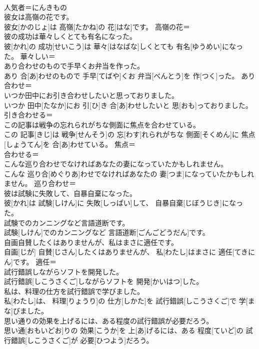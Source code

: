 \documentclass[8pt]{extreport}
\begin{document}
\begin{CJK}{UTF8}{min}
\\	人気者＝にんきもの
\\	彼女は高嶺の花です。	
\\	彼女[かのじょ]は 高嶺[たかね]の 花[はな]です。	高嶺の花＝ 
\\	彼の成功は華々しくとても有名になった。	
\\	彼[かれ]の 成功[せいこう]は 華々[はなばな]しくとても 有名[ゆうめい]になった。	華々しい＝ 
\\	あり合わせのもので手早くお弁当を作った。	
\\	あり 合[あ]わせのもので 手早[てばや]くお 弁当[べんとう]を 作[つく]った。	あり合わせ＝ 
\\	いつか田中にお引き合わせしたいと思っておりました。	
\\	いつか 田中[たなか]にお 引[ひ]き 合[あ]わせしたいと 思[おも]っておりました。	引き合わせる＝ 
\\	この記事は戦争の忘れられがちな側面に焦点を合わせている。	
\\	この 記事[きじ]は 戦争[せんそう]の 忘[わす]れられがちな 側面[そくめん]に 焦点[しょうてん]を 合[あ]わせている。	焦点＝ 
\\	合わせる＝ 
\\	こんな巡り合わせでなければあなたの妻になっていたかもしれません。	
\\	こんな 巡り合[めぐりあ]わせでなければあなたの 妻[つま]になっていたかもしれません。	巡り合わせ＝ 
\\	彼は試験に失敗して、自暴自棄になった。	
\\	彼[かれ]は 試験[しけん]に 失敗[しっぱい]して、 自暴自棄[じぼうじき]になった。	
\\	試験でのカンニングなど言語道断です。	
\\	試験[しけん]でのカンニングなど 言語道断[ごんごどうだん]です。	
\\	自画自賛したくはありませんが、私はまさに適任です。	
\\	自画[じが] 自賛[じさん]したくはありませんが、 私[わたし]はまさに 適任[てきにん]です。	適任＝ 
\\	試行錯誤しながらソフトを開発した。	
\\	試行錯誤[しこうさくご]しながらソフトを 開発[かいはつ]した。	
\\	私は、料理の仕方を試行錯誤で学びました。	
\\	私[わたし]は、 料理[りょうり]の 仕方[しかた]を 試行錯誤[しこうさくご]で 学[まな]びました。	
\\	思い通りの効果を上げるには、ある程度の試行錯誤が必要だろう。	
\\	思い通[おもいどお]りの 効果[こうか]を 上[あ]げるには、ある 程度[ていど]の 試行錯誤[しこうさくご]が 必要[ひつよう]だろう。	

\end{CJK}
\end{document}
